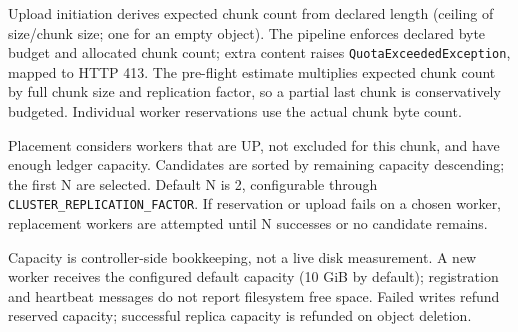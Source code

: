 \documentclass[11pt,a4paper]{article}
\begin{document}
Upload initiation derives expected chunk count from declared length (ceiling of size/chunk size; one for an empty object). The pipeline enforces declared byte budget and allocated chunk count; extra content raises \texttt{QuotaExceededException}, mapped to HTTP 413. The pre-flight estimate multiplies expected chunk count by full chunk size and replication factor, so a partial last chunk is conservatively budgeted. Individual worker reservations use the actual chunk byte count.

Placement considers workers that are UP, not excluded for this chunk, and have enough ledger capacity. Candidates are sorted by remaining capacity descending; the first N are selected. Default N is 2, configurable through \texttt{CLUSTER\_REPLICATION\_FACTOR}. If reservation or upload fails on a chosen worker, replacement workers are attempted until N successes or no candidate remains.

Capacity is controller-side bookkeeping, not a live disk measurement. A new worker receives the configured default capacity (10 GiB by default); registration and heartbeat messages do not report filesystem free space. Failed writes refund reserved capacity; successful replica capacity is refunded on object deletion.
\end{document}
